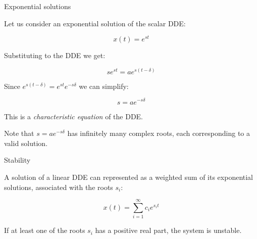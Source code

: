 \documentclass{beamer}
\begin{document}
\begin{frame}{Exponential solutions}
	\begin{flushleft}
		
		Let us consider an exponential solution of the scalar DDE:
		
		\begin{equation}
			x(t) = e^{s t}
		\end{equation}
		
		Substituting to the DDE we get:
		
		\begin{equation}
			s e^{s t} = a e^{s (t - \delta)}
		\end{equation}
		
		Since $e^{s (t - \delta)} = e^{st} e^{-s\delta} $ we can simplify:
		
		\begin{equation}
			s  = a e^{-s\delta} 
		\end{equation}
		
		This is a \emph{characteristic equation} of the DDE. %
		
		Note that $s  = a e^{-s\delta} $ has infinitely many complex roots, each corresponding to a valid solution. 
		
	\end{flushleft}
\end{frame}







\begin{frame}{Stability}
	\begin{flushleft}
		
		A solution of a linear DDE can represented as a weighted sum of its exponential solutions, associated with the roots $s_i$:
		
		\begin{equation}
			x(t) = \sum_{i=1}^\infty c_i e^{s_i t}
		\end{equation}
		
		If at least one of the roots $s_i$ has a positive real part, the system is unstable.
		
		
	\end{flushleft}
\end{frame}
\end{document}
